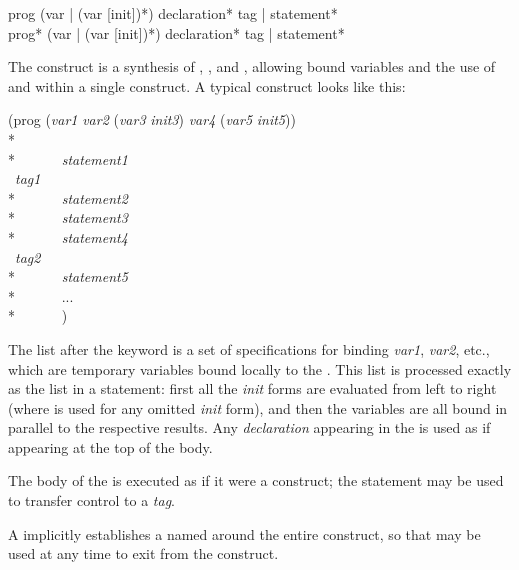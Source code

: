 \begin{defmac}
prog ({var | (var [init])}*) {declaration}* {tag | statement}* \\
prog* ({var | (var [init])}*) {declaration}* {tag | statement}*

The  construct is a synthesis of , ,
and , allowing bound variables and the use of  and 
within a single construct.  A typical  construct looks like this:
\begin{lisp}
(prog ({\it var1} {\it var2} ({\it var3} {\it init3}) {\it var4} ({\it var5} {\it init5})) \\*
~~~~~~ \\*
~~~~~~{\it statement1} \\
~{\it tag1} \\*
~~~~~~{\it statement2} \\*
~~~~~~{\it statement3} \\*
~~~~~~{\it statement4} \\
~{\it tag2} \\*
~~~~~~{\it statement5} \\*
~~~~~~... \\*
~~~~~~)
\end{lisp}
The list after the keyword  is a set of specifications for binding
{\it var1}, {\it var2}, etc.,
which are temporary variables bound locally to the .
This list is processed exactly as the list in a  statement:
first all the {\it init} forms are evaluated from left to right
(where {\false} is used for
any omitted {\it init} form), and then the variables are all bound in
parallel to the respective results.
Any {\it declaration} appearing in the  is used as if appearing
at the top of the  body.

The body of the  is executed as if it were a 
construct; the  statement may be used to transfer control
to a {\it tag}.

A  implicitly establishes a  named {\nil} around
the entire  construct, so that  may be used
at any time to exit from the  construct.


\end{defmac}
